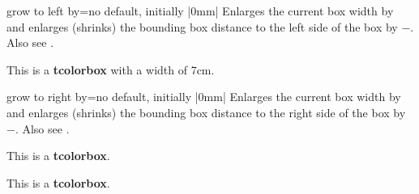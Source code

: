 \begin{docTcbKey}{grow to left by}{=}{no default, initially |0mm|}
  Enlarges the current box width by  and
  enlarges (shrinks) the bounding box distance to the left side of the box by
  $-$. Also see .
\begin{dispExample}

\begin{tcolorbox}[width=5cm,grow to left by=2cm,enhanced,show bounding box]
This is a \textbf{tcolorbox} with a width of 7cm.
\end{tcolorbox}
\end{dispExample}
\end{docTcbKey}

\begin{docTcbKey}{grow to right by}{=}{no default, initially |0mm|}
  Enlarges the current box width by  and
  enlarges (shrinks) the bounding box distance to the right side of the box by
  $-$. Also see .
\begin{dispExample}

\begin{tcolorbox}[grow to right by=2cm,enhanced,show bounding box]
This is a \textbf{tcolorbox}.
\end{tcolorbox}

\bigskip

\begin{tcolorbox}[grow to right by=2cm,grow to left by=1cm,
  enhanced,show bounding box]
This is a \textbf{tcolorbox}.
\end{tcolorbox}

\end{dispExample}
\end{docTcbKey}


